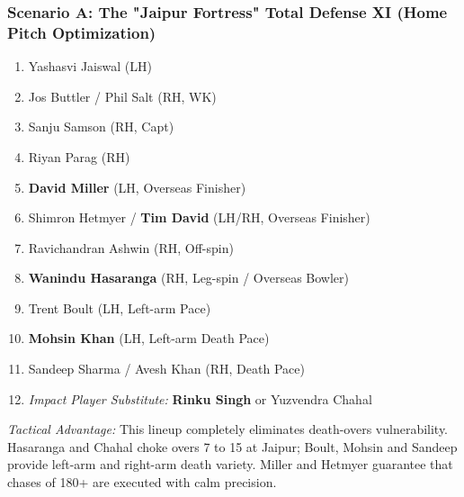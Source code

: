 \documentclass[11pt,a4paper]{article}
\begin{document}
\subsubsection{Scenario A: The "Jaipur Fortress" Total Defense XI (Home Pitch Optimization)}
\begin{enumerate}
    \item Yashasvi Jaiswal (LH)
    \item Jos Buttler / Phil Salt (RH, WK)
    \item Sanju Samson (RH, Capt)
    \item Riyan Parag (RH)
    \item \textbf{David Miller} (LH, Overseas Finisher)
    \item Shimron Hetmyer / \textbf{Tim David} (LH/RH, Overseas Finisher)
    \item Ravichandran Ashwin (RH, Off-spin)
    \item \textbf{Wanindu Hasaranga} (RH, Leg-spin / Overseas Bowler)
    \item Trent Boult (LH, Left-arm Pace)
    \item \textbf{Mohsin Khan} (LH, Left-arm Death Pace)
    \item Sandeep Sharma / Avesh Khan (RH, Death Pace)
    \item \textit{Impact Player Substitute:} \textbf{Rinku Singh} or Yuzvendra Chahal
\end{enumerate}
\textit{Tactical Advantage:} This lineup completely eliminates death-overs vulnerability. Hasaranga and Chahal choke overs 7 to 15 at Jaipur; Boult, Mohsin and Sandeep provide left-arm and right-arm death variety. Miller and Hetmyer guarantee that chases of 180+ are executed with calm precision.
\end{document}
